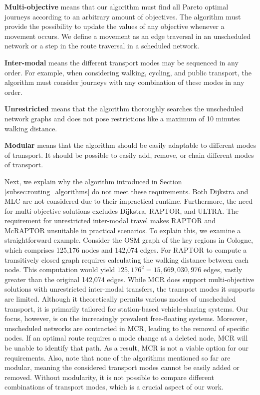 \textbf{Multi-objective} means that our algorithm must find all Pareto optimal journeys according to an arbitrary amount of objectives.
The algorithm must provide the possibility to update the values of any objective whenever a movement occurs.
We define a movement as an edge traversal in an unscheduled network or a step in the route traversal in a scheduled network.

\textbf{Inter-modal} means the different transport modes may be sequenced in any order.
For example, when considering walking, cycling, and public transport, the algorithm must consider journeys with any combination of these modes in any order.

\textbf{Unrestricted} means that the algorithm thoroughly searches the unscheduled network graphs and does not pose restrictions like a maximum of 10 minutes walking distance.

\textbf{Modular} means that the algorithm should be easily adaptable to different modes of transport.
It should be possible to easily add, remove, or chain different modes of transport.


Next, we explain why the algorithm introduced in Section \ref{subsec:routing_algorithms} do not meet these requirements.
Both Dijkstra and MLC are not considered due to their impractical runtime.
Furthermore, the need for multi-objective solutions excludes Dijkstra, RAPTOR, and ULTRA.
The requirement for unrestricted inter-modal travel makes RAPTOR and McRAPTOR unsuitable in practical scenarios.
To explain this, we examine a straightforward example.
Consider the OSM graph of the key regions in Cologne, which comprises 125,176 nodes and 142,074 edges.
For RAPTOR to compute a transitively closed graph requires calculating the walking distance between each node.
This computation would yield \(125,176^2 = 15,669,030,976\) edges, vastly greater than the original 142,074 edges.
While MCR does support multi-objective solutions with unrestricted inter-modal transfers, the transport modes it supports are limited.
Although it theoretically permits various modes of unscheduled transport, it is primarily tailored for station-based vehicle-sharing systems.
Our focus, however, is on the increasingly prevalent free-floating systems.
Moreover, unscheduled networks are contracted in MCR, leading to the removal of specific nodes.
If an optimal route requires a mode change at a deleted node, MCR will be unable to identify that path.
As a result, MCR is not a viable option for our requirements.
Also, note that none of the algorithms mentioned so far are modular, meaning the considered transport modes cannot be easily added or removed.
Without modularity, it is not possible to compare different combinations of transport modes, which is a crucial aspect of our work.

